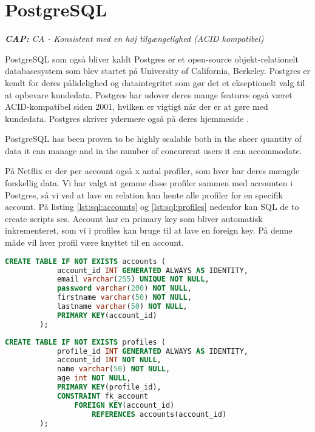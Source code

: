 \section{PostgreSQL}
\begin{displayquote}
    \textit{\textbf{CAP:} CA - Konsistent med en høj tilgængelighed (ACID kompatibel)}
\end{displayquote}

PostgreSQL som også bliver kaldt Postgres er et open-source objekt-relationelt databasesystem som blev startet på University of California, Berkeley. \cite{postgresabout} Postgres er kendt for deres pålidelighed og dataintegritet som gør det et ekseptionelt valg til at opbevare kundedata. Postgres har udover deres mange features også været ACID-kompatibel siden 2001, hvilken er vigtigt når der er at gøre med kundedata. Postgres skriver ydermere også på deres hjemmeside \cite{postgresabout}.
\begin{displayquote}
    PostgreSQL has been proven to be highly scalable both in the sheer quantity of data it can manage and in the number of concurrent users it can accommodate.
\end{displayquote}
På Netflix er der per account også x antal profiler, som hver har deres mængde forskellig data. Vi har valgt at gemme disse profiler sammen med accounten i Postgres, så vi ved at lave en relation kan hente alle profiler for en specifik account. På listing \ref{lst:sql:accounts} og \ref{lst:sql:profiles} nedenfor kan SQL de to create scripts ses. Account har en primary key som bliver automatisk inkrementeret, som vi i profiles kan bruge til at lave en foreign key. På denne måde vil hver profil være knyttet til en account.

\begin{tcolorbox}
    \lstset{style=sharpstyle}
    \begin{lstlisting}[language={SQL}, caption={Logs HBASE Model}, label={lst:sql:accounts}]
        CREATE TABLE IF NOT EXISTS accounts (
            account_id INT GENERATED ALWAYS AS IDENTITY,
            email varchar(255) UNIQUE NOT NULL,
            password varchar(200) NOT NULL,
            firstname varchar(50) NOT NULL,
            lastname varchar(50) NOT NULL,
            PRIMARY KEY(account_id)
        );
    \end{lstlisting}
\end{tcolorbox}

\begin{tcolorbox}
    \lstset{style=sharpstyle}
    \begin{lstlisting}[language={SQL}, caption={Logs HBASE Model}, label={lst:sql:profiles}]
        CREATE TABLE IF NOT EXISTS profiles (
            profile_id INT GENERATED ALWAYS AS IDENTITY,
            account_id INT NOT NULL,
            name varchar(50) NOT NULL,
            age int NOT NULL,
            PRIMARY KEY(profile_id),
            CONSTRAINT fk_account
                FOREIGN KEY(account_id)
                    REFERENCES accounts(account_id)
        );
    \end{lstlisting}
\end{tcolorbox}
